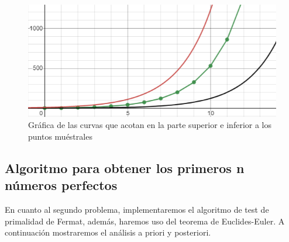 \documentclass[12pt,twoside]{article}
\begin{document}
\begin{figure}[H]
    \centering
    \includegraphics[width=12cm]{imagenes/grafica221.png}
    \caption{Gr\'afica de las curvas que acotan en la parte superior e inferior a los puntos mu\'estrales}
    \label{fig:my_label}
\end{figure}    

\newpage

\subsection{Algoritmo para obtener los primeros n números perfectos}
En cuanto al segundo problema, implementaremos el algoritmo de test de primalidad de Fermat, además, haremos uso del teorema de Euclides-Euler. A continuación mostraremos el análisis a priori y posteriori.
\newline
\end{document}
